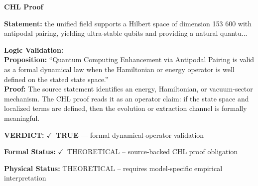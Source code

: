 \vspace{0.45em}
\noindent\textbf{CHL Proof}\par
\textbf{Statement:} the unified field supports a Hilbert space of dimension 153 600 with antipodal pairing,
yielding ultra-stable qubits and providing a natural quantu...

\textbf{Logic Validation:}\\
\textbf{Proposition:} ``Quantum Computing Enhancement via Antipodal Pairing is valid as a formal dynamical law
when the Hamiltonian or energy operator is well defined on the stated state space.''\\
\textbf{Proof:} The source statement identifies an energy, Hamiltonian, or vacuum-sector mechanism. The
CHL proof reads it as an operator claim: if the state space and localized terms are
defined, then the evolution or extraction channel is formally meaningful.

\textbf{VERDICT:} \ensuremath{\checkmark}\ \textbf{TRUE} --- formal dynamical-operator validation

\textbf{Formal Status:} \ensuremath{\checkmark}\ THEORETICAL -- source-backed CHL proof obligation

\textbf{Physical Status:} THEORETICAL -- requires model-specific empirical interpretation
\par\vspace{0.45em}
\par
\ifTZPDarkEdition
{}
\fi
\endgroup
\endgroup
